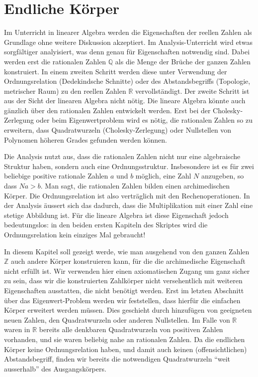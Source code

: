 %
%
%
\section{Endliche Körper}
Im Unterricht in linearer Algebra werden die Eigenschaften der reellen
Zahlen als Grundlage ohne weitere Diskussion akzeptiert.
Im Analysis-Unterricht wird etwas sorgfältiger analyisiert, was denn
genau für Eigenschaften notwendig sind.
Dabei werden erst die rationalen Zahlen $\mathbb Q$ als die Menge der
Brüche der ganzen Zahlen konstruiert.
In einem zweiten Schritt werden diese unter Verwendung der Ordnungsrelation
(Dedekindsche Schnitte)
oder des Abstandsbegriffs (Topologie, metrischer Raum) zu den reellen
Zahlen $\mathbb R$ vervollständigt.
Der zweite Schritt ist aus der Sicht der linearen Algebra nicht nötig.
Die lineare Algebra könnte auch gänzlich über den rationalen Zahlen
entwickelt werden.
Erst bei der Cholesky-Zerlegung oder beim Eigenwertproblem wird es
nötig, die rationalen Zahlen so zu erweitern, dass Quadratwurzeln
(Cholesky-Zerlegung) oder Nullstellen von Polynomen höheren Grades
gefunden werden können.

Die Analysis nutzt aus, dass die rationalen Zahlen nicht nur eine algebraische
Struktur haben, sondern auch eine Ordnungsstruktur.
Insbesondere ist es für zwei beliebige positive rationale Zahlen
$a$ und $b$ möglich, eine Zahl $N$ anzugeben, so dass $Na>b$.
Man sagt, die rationalen Zahlen bilden einen archimedischen Körper.
Die Ordnungsrelation ist also verträglich mit den Rechenoperationen.
In der Analysis äussert sich das dadurch, dass die Multiplikation mit
einer Zahl eine stetige Abbildung ist.
Für die lineare Algebra ist diese Eigenschaft jedoch bedeutungslos:
in den beiden ersten Kapiteln des Skriptes wird die Ordnungsrelation
kein einziges Mal gebraucht!

In diesem Kapitel soll gezeigt werde, wie man ausgehend von den
ganzen Zahlen $\mathbb Z$ auch andere Körper konstruieren kann,
für die die archimedische Eigenschaft nicht erfüllt ist.
Wir verwenden hier einen axiomatischen Zugang um ganz sicher zu sein,
dass wir die konstruierten Zahlkörper nicht versehentlich mit weiteren
Eigenschaften ausstatten, die nicht benötigt werden.
Erst im letzten Abschnitt über das Eigenwert-Problem werden wir
feststellen, dass hierfür die einfachen Körper erweitert werden
müssen.
Dies geschieht durch hinzufügen von geeigneten neuen Zahlen, den
Quadratwurzeln oder anderen Nullstellen.
Im Falle von $\mathbb R$ waren in $\mathbb R$ bereits alle denkbaren
Quadratwurzeln von positiven Zahlen vorhanden, und sie waren beliebig
nahe an rationalen Zahlen.
Da die endlichen Körper keine Ordnungsrelation haben, und damit auch
keinen (offensichtlichen) Abstandsbegriff, finden wir bereits die
notwendigen Quadratwurzeln ``weit ausserhalb'' des Ausgangskörpers.

